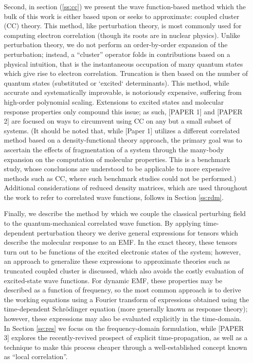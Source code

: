 Second, in section (\ref{ss:cc}) we present the wave function-based method which the bulk 
of this work is either based upon or seeks to approximate: coupled cluster (CC) theory.
\cite{Sinanoglu1964,Cizek1966,Cizek1969,Crawford2000} 
This method, like perturbation theory, is most commonly used for computing electron correlation 
(though its roots are in nuclear physics). 
Unlike perturbation theory, we do not perform an order-by-order expansion of the perturbation; 
instead, a ``cluster'' operator folds in contributions based on a physical intuition, that is the 
instantaneous occupation of many quantum states which give rise to electron correlation. Truncation
is then based on the number of quantum states (substituted or `excited` determinants). This method,
while accurate and systematically improvable, is notoriously expensive, suffering from high-order
polynomial scaling. Extensions to excited states and molecular response properties only compound this 
issue;
\cite{Hoodbhoy1979,Crawford2006,Helgaker2012,Crawford2019}
as such, [PAPER 1] and [PAPER 2] are focused on ways to circumvent using CC on any but a small 
subset of systems. (It should be noted that, while [Paper 1] utilizes a different correlated method 
based on a density-functional theory approach, the primary goal was to ascertain the effects of 
fragmentation of a system through the many-body expansion on the computation of molecular properties. 
This is a benchmark study, whose conclusions are understood to be applicable to more
expensive methods such as CC, where such benchmark studies could not be performed.)
Additional considerations of reduced density matrices,
\cite{RDM1976,Harris1992,pinkbook}
which are used throughout the work to refer
to correlated wave functions, follows in Section \ref{ss:rdm}.

Finally, we describe the method by which we couple the classical perturbing field to the 
quantum-mechanical correlated wave function. 
By applying time-dependent perturbation theory\cite{Langhoff} 
we derive general expressions for tensors which describe 
the molecular response to an EMF. In the exact theory, these tensors turn out to be functions of the 
excited electronic states of the system; however, an approach to generalize 
these expressions to approximate theories such as truncated coupled cluster is discussed,
\cite{Koch1990,Pedersen1997,Christiansen1998,Norman2011}
which also avoids the costly evaluation of excited-state wave functions. 
For dynamic EMF, these properties may be 
described as a function of frequency, so the most common approach is to derive the working equations
using a Fourier transform of expressions obtained using the time-dependent Schr\"odinger equation 
(more generally known as response theory); however, these expressions may also be evaluated explicitly
in the time-domain.
\cite{Goings2018,Li2020}
In Section \ref{se:res} we focus on the frequency-domain formulation, while
[PAPER 3] explores the recently-revived prospect of explicit time-propagation, as well as a 
technique to make this process cheaper through a well-established concept known as 
``local correlation''.\cite{Werner2006} 
